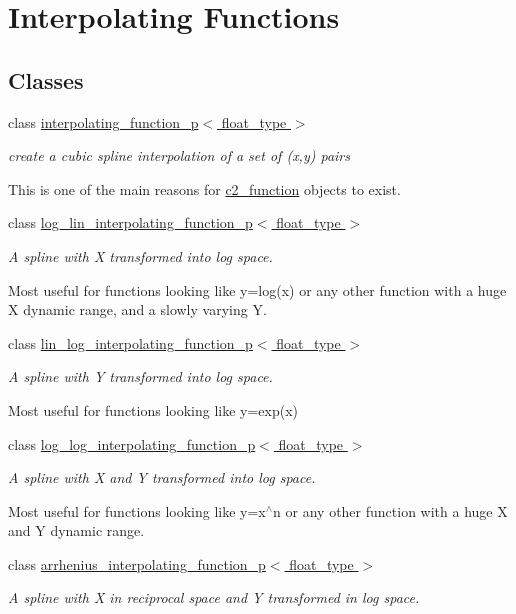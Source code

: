 \hypertarget{group__interpolators}{}\section{Interpolating Functions}
\label{group__interpolators}
\subsection*{Classes}
\begin{DoxyCompactItemize}
\item 
class \hyperlink{classinterpolating__function__p}{interpolating\+\_\+function\+\_\+p$<$ float\+\_\+type $>$}
\begin{DoxyCompactList}\small\item\em create a cubic spline interpolation of a set of (x,y) pairs

This is one of the main reasons for \hyperlink{classc2__function}{c2\+\_\+function} objects to exist. \end{DoxyCompactList}\item 
class \hyperlink{classlog__lin__interpolating__function__p}{log\+\_\+lin\+\_\+interpolating\+\_\+function\+\_\+p$<$ float\+\_\+type $>$}
\begin{DoxyCompactList}\small\item\em A spline with X transformed into log space.

Most useful for functions looking like y=log(x) or any other function with a huge X dynamic range, and a slowly varying Y. \end{DoxyCompactList}\item 
class \hyperlink{classlin__log__interpolating__function__p}{lin\+\_\+log\+\_\+interpolating\+\_\+function\+\_\+p$<$ float\+\_\+type $>$}
\begin{DoxyCompactList}\small\item\em A spline with Y transformed into log space.

Most useful for functions looking like y=exp(x) \end{DoxyCompactList}\item 
class \hyperlink{classlog__log__interpolating__function__p}{log\+\_\+log\+\_\+interpolating\+\_\+function\+\_\+p$<$ float\+\_\+type $>$}
\begin{DoxyCompactList}\small\item\em A spline with X and Y transformed into log space.

Most useful for functions looking like y=x$^\wedge$n or any other function with a huge X and Y dynamic range. \end{DoxyCompactList}\item 
class \hyperlink{classarrhenius__interpolating__function__p}{arrhenius\+\_\+interpolating\+\_\+function\+\_\+p$<$ float\+\_\+type $>$}
\begin{DoxyCompactList}\small\item\em A spline with X in reciprocal space and Y transformed in log space.


\end{DoxyCompactList}
\end{DoxyCompactItemize}
